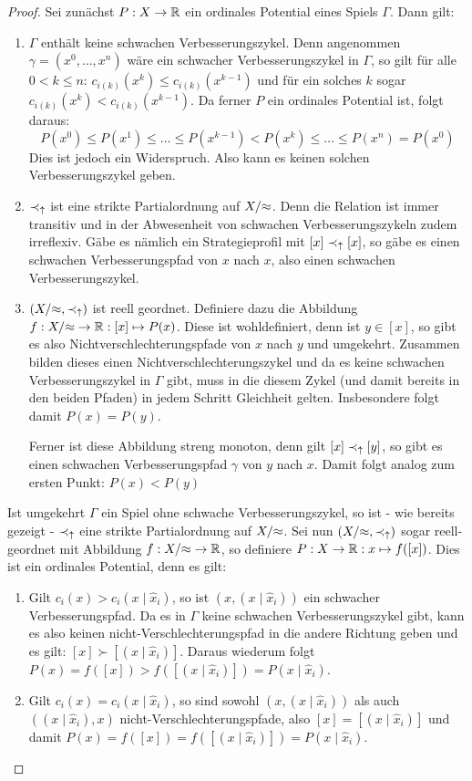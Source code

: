 \begin{proof}
	Sei zunächst $P: X \to \mathbb{R}$ ein ordinales Potential eines Spiels $\Gamma$. Dann gilt:
	\begin{enumerate}
		\item $\Gamma$ enthält keine schwachen Verbesserungszykel. Denn angenommen $\gamma = (x^0, \dots, x^n)$ wäre ein schwacher Verbesserungszykel in $\Gamma$, so gilt für alle $0 < k \leq n$: $c_{i(k)}(x^k) \leq c_{i(k)}(x^{k-1})$ und für ein solches $k$ sogar $c_{i(k)}(x^k) < c_{i(k)}(x^{k-1})$. Da ferner $P$ ein ordinales Potential ist, folgt daraus:
			\[P(x^0) \leq P(x^1) \leq \dots \leq P(x^{k-1}) < P(x^k) \leq \dots \leq P(x^n) = P(x^0)\]
		Dies ist jedoch ein Widerspruch. Also kann es keinen solchen Verbesserungszykel geben.
		
		\item $\prec_\uparrow$ ist eine strikte Partialordnung auf $X/{\approx}$. Denn die Relation ist immer transitiv und in der Abwesenheit von schwachen Verbesserungszykeln zudem irreflexiv. Gäbe es nämlich ein Strategieprofil mit $[x] \prec_\uparrow [x]$, so gäbe es einen schwachen Verbesserungspfad von $x$ nach $x$, also einen schwachen Verbesserungszykel.
		
		\item $(X/{\approx}, \prec_\uparrow)$ ist reell geordnet. Definiere dazu die Abbildung $f: X/{\approx} \to \mathbb{R}: [x] \mapsto P(x)$. Diese ist wohldefiniert, denn ist $y \in [x]$, so gibt es also Nichtverschlechterungspfade von $x$ nach $y$ und umgekehrt. Zusammen bilden dieses einen Nichtverschlechterungszykel und da es keine schwachen Verbesserungszykel in $\Gamma$ gibt, muss in die diesem Zykel (und damit bereits in den beiden Pfaden) in jedem Schritt Gleichheit gelten. Insbesondere folgt damit $P(x) = P(y)$.
		
		Ferner ist diese Abbildung streng monoton, denn gilt $[x] \prec_\uparrow [y]$, so gibt es einen schwachen Verbesserungspfad $\gamma$ von $y$ nach $x$. Damit folgt analog zum ersten Punkt: $P(x) < P(y)$
	\end{enumerate}

	Ist umgekehrt $\Gamma$ ein Spiel ohne schwache Verbesserungszykel, so ist - wie bereits gezeigt - $\prec_\uparrow$ eine strikte Partialordnung auf $X/{\approx}$. Sei nun $(X/{\approx}, \prec_\uparrow)$ sogar reell-geordnet mit Abbildung $f: X/{\approx} \to \mathbb{R}$, so definiere $P: X \to \mathbb{R}: x \mapsto f([x])$. Dies ist ein ordinales Potential, denn es gilt:
	\begin{enumerate}
		\item Gilt $c_i(x) > c_i(x \mid \hat{x}_i)$, so ist $(x, (x \mid \hat{x}_i))$ ein schwacher Verbesserungspfad. Da es in $\Gamma$ keine schwachen Verbesserungszykel gibt, kann es also keinen nicht-Verschlechterungspfad in die andere Richtung geben und es gilt: $[x] \succ [(x \mid \hat{x}_i)]$. Daraus wiederum folgt $P(x) = f([x]) > f([(x \mid \hat{x}_i)]) = P(x \mid \hat{x}_i)$.
		\item Gilt $c_i(x) = c_i(x \mid \hat{x}_i)$, so sind sowohl $(x, (x \mid \hat{x}_i))$ als auch $((x \mid \hat{x}_i), x)$ nicht-Verschlechterungspfade, also $[x] = [(x \mid \hat{x}_i)]$ und damit $P(x) = f([x]) = f([(x \mid \hat{x}_i)]) = P(x \mid \hat{x}_i)$. \qedhere
	\end{enumerate}
\end{proof}

